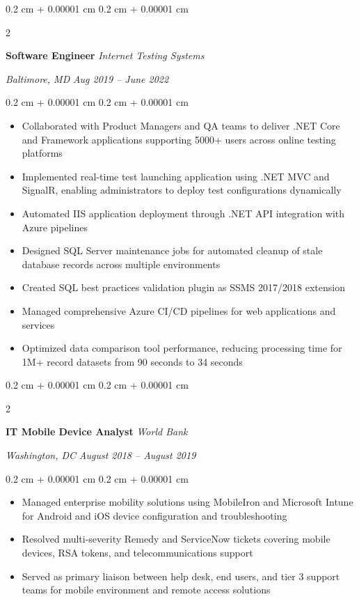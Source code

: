 \documentclass[10pt, letterpaper]{article}
\newenvironment{highlights}{
    \begin{itemize}[
        topsep=0.10 cm,
        parsep=0.10 cm,
        partopsep=0pt,
        itemsep=0pt,
        leftmargin=0.4 cm + 10pt
        ]
    }{
\end{itemize}
} %
\newenvironment{onecolentry}{
    \begin{adjustwidth}{
            0.2 cm + 0.00001 cm
        }{
            0.2 cm + 0.00001 cm
        }
    }{
    \end{adjustwidth}
} %
\newenvironment{twocolentry}[2][]{
    \onecolentry
    \def\secondColumn{#2}
    \setcolumnwidth{\fill, 10.5 cm}
    \begin{paracol}{2}
    }{
        \switchcolumn \raggedleft \secondColumn
    \end{paracol}
    \endonecolentry
} %
\begin{document}
    \vspace{0.2 cm}
    \begin{twocolentry}{
            \textit{Baltimore, MD}
        \textit{Aug 2019 – June 2022}}
        \textbf{Software Engineer}
        \textit{Internet Testing Systems}
    \end{twocolentry}
    \vspace{0.10 cm}
    \begin{onecolentry}
        \begin{highlights}
        \item Collaborated with Product Managers and QA teams to deliver .NET Core and Framework applications supporting 5000+ users across online testing platforms
        \item Implemented real-time test launching application using .NET MVC and SignalR, enabling administrators to deploy test configurations dynamically
        \item Automated IIS application deployment through .NET API integration with Azure pipelines
        \item Designed SQL Server maintenance jobs for automated cleanup of stale database records across multiple environments
        \item Created SQL best practices validation plugin as SSMS 2017/2018 extension
        \item Managed comprehensive Azure CI/CD pipelines for web applications and services
        \item Optimized data comparison tool performance, reducing processing time for 1M+ record datasets from 90 seconds to 34 seconds
        \end{highlights}
    \end{onecolentry}
    \begin{twocolentry}{
        \textit{Washington, DC}
        \textit{August 2018 – August 2019}}
        \textbf{IT Mobile Device Analyst}
        \textit{World Bank}
    \end{twocolentry}
    \vspace{0.10 cm}
    \begin{onecolentry}
        \begin{highlights}
        \item Managed enterprise mobility solutions using MobileIron and Microsoft Intune for Android and iOS device configuration and troubleshooting
        \item Resolved multi-severity Remedy and ServiceNow tickets covering mobile devices, RSA tokens, and telecommunications support
        \item Served as primary liaison between help desk, end users, and tier 3 support teams for mobile environment and remote access solutions
        \end{highlights}
    \end{onecolentry}
\end{document}
